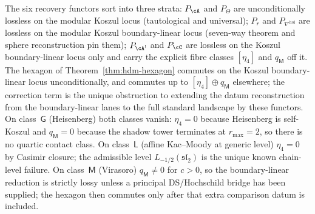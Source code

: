 \begin{remark}
\label{rem:hdm-recovery-fibre-map}
The six recovery functors sort into three strata:
$P_\cA$ and $P_\Theta$ are unconditionally lossless on the modular
Koszul locus (tautological and universal); $P_r$ and
$P_{\nabla^{\mathrm{hol}}}$ are lossless on the modular Koszul
boundary-linear locus (seven-way theorem and sphere reconstruction
pin them); $P_{\cA^!}$ and $P_\cC$ are lossless on the Koszul
boundary-linear locus only and carry the explicit fibre classes
$[\eta_4]$ and $q_\mathsf{M}$ off it. The hexagon of
Theorem~\ref{thm:hdm-hexagon} commutes on the Koszul boundary-linear
locus unconditionally, and commutes up to
$[\eta_4]\oplus q_\mathsf{M}$ elsewhere; the correction term is the
unique obstruction to extending the datum reconstruction from the
boundary-linear lanes to the full standard landscape by these
functors. On class~$\mathsf{G}$
(Heisenberg) both classes vanish: $\eta_4=0$ because Heisenberg is
self-Koszul and $q_\mathsf{M}=0$ because the shadow tower terminates
at $r_{\max}=2$, so there is no quartic contact class. On
class~$\mathsf{L}$ (affine Kac--Moody at generic level) $\eta_4=0$
by Casimir closure; the admissible level $L_{-1/2}(\mathfrak{sl}_2)$
is the unique known chain-level failure. On class~$\mathsf{M}$
(Virasoro) $q_\mathsf{M}\neq 0$ for $c>0$, so the boundary-linear
reduction is strictly lossy unless a principal DS/Hochschild bridge
has been supplied; the hexagon then commutes only after that extra
comparison datum is included.
\end{remark}

